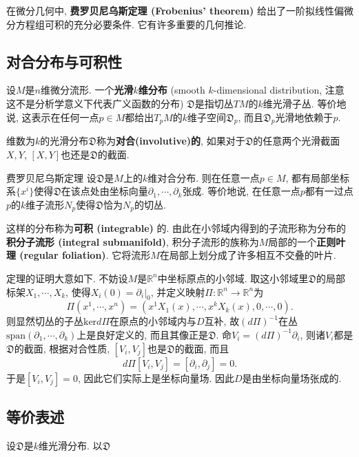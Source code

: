 
在微分几何中, \textbf{费罗贝尼乌斯定理 (Frobenius' theorem)} 给出了一阶拟线性偏微分方程组可积的充分必要条件. 它有许多重要的几何推论.

\subsection{对合分布与可积性}
设$M$是$n$维微分流形. 一个\textbf{光滑$k$维分布} (smooth $k$-dimensional distribution, 注意这不是分析学意义下代表广义函数的分布) $\mathfrak{D}$是指切丛$TM$的$k$维光滑子丛. 等价地说, 这表示在任何一点$p\in M$都给出$T_pM$的$k$维子空间$\mathfrak{D}_p$, 而且$\mathfrak{D}_p$光滑地依赖于$p$. 

维数为$k$的光滑分布$\mathfrak{D}$称为\textbf{对合(involutive)的}, 如果对于$\mathfrak{D}$的任意两个光滑截面$X,Y$, $[X,Y]$也还是$\mathfrak{D}$的截面. 

\begin{theorem}{费罗贝尼乌斯定理}
设$\mathfrak{D}$是$M$上的$k$维对合分布. 则在任意一点$p\in M$, 都有局部坐标系$\{x^i\}$使得$\mathfrak{D}$在该点处由坐标向量$\partial_1,\cdots ,\partial_k$张成. 等价地说, 在任意一点$p$都有一过点$p$的$k$维子流形$N_p$使得$\mathfrak{D}$恰为$N_p$的切丛.
\end{theorem}
这样的分布称为\textbf{可积 (integrable)} 的. 由此在小邻域内得到的子流形称为分布的\textbf{积分子流形 (integral submanifold)}, 积分子流形的族称为$M$局部的一个\textbf{正则叶理 (regular foliation)}. 它将流形$M$在局部上划分成了许多相互不交叠的叶片.

定理的证明大意如下. 不妨设$M$是$\mathbb{R}^n$中坐标原点的小邻域. 取这小邻域里$\mathfrak{D}$的局部标架$X_1,\cdots ,X_k$, 使得$X_i(0)=\partial_i|_0$, 并定义映射$\Pi: \mathbb{R}^n\to \mathbb{R}^n$为
$$
\Pi(x^1,\cdots ,x^n)=(x^1X_1(x),\cdots ,x^kX_k(x),0,\cdots ,0).
$$
则显然切丛的子丛$\text{ker}d\Pi$在原点的小邻域内与$D$互补, 故$(d\Pi)^{-1}$在丛$\text{span}(\partial_1,\cdots ,\partial_k)$上是良好定义的, 而且其像正是$\mathfrak{D}$. 命$V_i=(d\Pi)^{-1}\partial_i$, 则诸$V_i$都是$\mathfrak{D}$的截面, 根据对合性质, $[V_i,V_j]$也是$\mathfrak{D}$的截面, 而且
$$
d\Pi[V_i,V_j]=[\partial_i,\partial_j]=0.
$$
于是$[V_i,V_j]=0$, 因此它们实际上是坐标向量场. 因此$D$是由坐标向量场张成的. 

\subsection{等价表述}
设$\mathfrak{D}$是$k$维光滑分布. 以$\mathfrak{D}$

